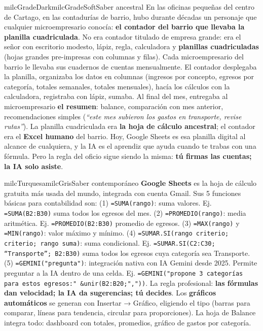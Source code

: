 \documentclass[11pt,letterpaper]{article}
\begin{document}
\begin{softbox}{milcGradeDark}{milcGradeSoft}{Saber ancestral}
En las oficinas pequeñas del centro de Cartago, en las contadurías de barrio, hubo durante décadas un personaje que cualquier microempresario conocía: \textbf{el contador del barrio que llevaba la planilla cuadriculada}. No era contador titulado de empresa grande: era el señor con escritorio modesto, lápiz, regla, calculadora y \textbf{planillas cuadriculadas} (hojas grandes pre-impresas con columnas y filas). Cada microempresario del barrio le llevaba sus cuadernos de cuentas mensualmente. El contador desplegaba la planilla, organizaba los datos en columnas (ingresos por concepto, egresos por categoría, totales semanales, totales mensuales), hacía los cálculos con la calculadora, registraba con lápiz, sumaba. Al final del mes, entregaba al microempresario \textbf{el resumen}: balance, comparación con mes anterior, recomendaciones simples (\emph{``este mes subieron los gastos en transporte, revise rutas''}). La planilla cuadriculada era \textbf{la hoja de cálculo ancestral}; el contador era el \textbf{Excel humano} del barrio. Hoy, Google Sheets es esa planilla digital al alcance de cualquiera, y la IA es el aprendiz que ayuda cuando te trabas con una fórmula. Pero la regla del oficio sigue siendo la misma: \textbf{tú firmas las cuentas; la IA solo asiste}.
\end{softbox}

\begin{softbox}{milcTurquesa}{milcGris}{Saber contemporáneo}
\textbf{Google Sheets} es la hoja de cálculo gratuita más usada del mundo, integrada con cuenta Gmail. Sus 5 funciones básicas para contabilidad son: (1) \texttt{=SUMA(rango)}: suma valores. Ej. \texttt{=SUMA(B2:B30)} suma todos los egresos del mes. (2) \texttt{=PROMEDIO(rango)}: media aritmética. Ej. \texttt{=PROMEDIO(B2:B30)} promedio de egresos. (3) \texttt{=MAX(rango)} y \texttt{=MIN(rango)}: valor máximo y mínimo. (4) \texttt{=SUMAR.SI(rango criterio; criterio; rango suma)}: suma condicional. Ej. \texttt{=SUMAR.SI(C2:C30; ``Transporte''; B2:B30)} suma todos los egresos cuya categoría sea Transporte. (5) \texttt{=GEMINI("pregunta")}: integración nativa con IA Gemini desde 2025. Permite preguntar a la IA dentro de una celda. Ej. \texttt{=GEMINI("propone 3 categorías para estos egresos:" \&unir(B2:B20;","))}. La regla profesional: \textbf{las fórmulas dan velocidad; la IA da sugerencias; tú decides}. Los \textbf{gráficos automáticos} se generan con Insertar → Gráfico, eligiendo el tipo (barras para comparar, líneas para tendencia, circular para proporciones). La hoja de Balance integra todo: dashboard con totales, promedios, gráfico de gastos por categoría.
\end{softbox}
\end{document}
